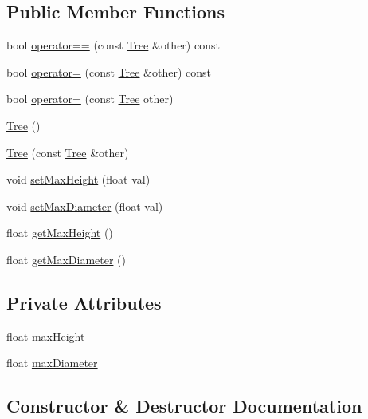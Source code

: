 \subsection*{Public Member Functions}
\begin{DoxyCompactItemize}
\item 
bool \mbox{\hyperlink{class_tree_a9672b806456d9c1fc6a9ffa0a0803071}{operator==}} (const \mbox{\hyperlink{class_tree}{Tree}} \&other) const
\item 
bool \mbox{\hyperlink{class_tree_a9d2ba086c896bd54a3d789da5d0ae7dc}{operator=}} (const \mbox{\hyperlink{class_tree}{Tree}} \&other) const
\item 
bool \mbox{\hyperlink{class_tree_af56ab40d0b2a675c75e3ad10de48ada2}{operator=}} (const \mbox{\hyperlink{class_tree}{Tree}} other)
\item 
\mbox{\hyperlink{class_tree_ad376a7c639d857312f5de2ef47482f68}{Tree}} ()
\item 
\mbox{\hyperlink{class_tree_af785767b64df102fdfe700b745d8bb46}{Tree}} (const \mbox{\hyperlink{class_tree}{Tree}} \&other)
\item 
void \mbox{\hyperlink{class_tree_afb29372db5251e9355aedd129e5d9a49}{set\+Max\+Height}} (float val)
\item 
void \mbox{\hyperlink{class_tree_a4073a7cc0b9b3388db7bff4491e96e72}{set\+Max\+Diameter}} (float val)
\item 
float \mbox{\hyperlink{class_tree_a80804b08cd149e9f1a7a40c780ceaada}{get\+Max\+Height}} ()
\item 
float \mbox{\hyperlink{class_tree_aad7df58595f64d5c3f5b1e7ff5ae6cd9}{get\+Max\+Diameter}} ()
\end{DoxyCompactItemize}
\subsection*{Private Attributes}
\begin{DoxyCompactItemize}
\item 
float \mbox{\hyperlink{class_tree_a5bcc9823dd464d77520fbafdc1c8eb44}{max\+Height}}
\item 
float \mbox{\hyperlink{class_tree_a078ecd006ec479cde84bf9e4f96219a8}{max\+Diameter}}
\end{DoxyCompactItemize}


\subsection{Constructor \& Destructor Documentation}
\mbox{\label{class_tree_ad376a7c639d857312f5de2ef47482f68}} 
